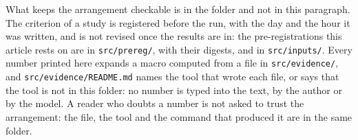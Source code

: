 What keeps the arrangement checkable is in the folder and not in this paragraph. The criterion of
a study is registered before the run, with the day and the hour it was written, and is not revised
once the results are in: the pre-registrations this article rests on are in \texttt{src/prereg/},
with their digests, and in \texttt{src/inputs/}. Every number printed here expands a macro computed
from a file in \texttt{src/evidence/}, and \texttt{src/evidence/README.md} names the tool that wrote
each file, or says that the tool is not in this folder: no number is typed into the text, by the
author or by the model. A reader who doubts a number is not asked to
trust the arrangement: the file, the tool and the command that produced it are in the same folder.
